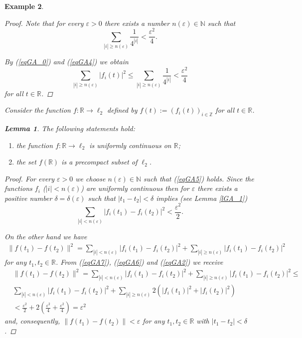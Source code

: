 \documentclass{amsart}%
\newtheorem{lemma}{Lemma}[section]
\newtheorem{example}[lemma]{Example}
\begin{document}
\begin{example}
\begin{proof}
Note that for every $\varepsilon >0$ there exists a number
$n(\varepsilon)\in \mathbb N$ such that
\begin{equation}\label{eqGA4}
\sum\limits_{|i|\ge
n(\varepsilon)}\frac{1}{4^{|i|}}<\frac{\varepsilon^{2}}{4} .
\end{equation}

By (\ref{eqGA_0}) and (\ref{eqGA4}) we obtain
\begin{equation}\label{eqGA5}
\sum\limits_{|i|\ge n(\varepsilon)}|f_{i}(t)|^{2}\le
\sum\limits_{|i|\ge
n(\varepsilon)}\frac{1}{4^{|i|}}<\frac{\varepsilon^{2}}{4}
\end{equation}
for all $t\in \mathbb R$.
\end{proof}

Consider the function $f:\mathbb R\to \ell_{2}$ defined by
$f(t):=(f_{i}(t))_{i\in \mathbb Z}$ for all $t\in \mathbb R$.

\begin{lemma}\label{lGA2} The following statements hold:
\begin{enumerate}
\item the function $f:\mathbb R\to \ell_{2}$ is uniformly
continuous on $\mathbb R$; \item the set $f(\mathbb R)$ is a
precompact subset of $\ell_{2}$.
\end{enumerate}
\end{lemma}
\begin{proof}
For every $\varepsilon >0$ we choose $n(\varepsilon)\in \mathbb N$
such that (\ref{eqGA5}) holds. Since the functions $f_{i}$ ($|i|<
n(\varepsilon)$) are uniformly continuous then for $\varepsilon$
there exists a positive number $\delta =\delta(\varepsilon)$ such
that $|t_1-t_2|<\delta$ implies (see Lemma \ref{lGA_1})
\begin{equation}\label{eqGA6}
\sum\limits_{|i|<
n(\varepsilon)}|f_{i}(t_1)-f_{i}(t_2)|^{2}<\frac{\varepsilon^{2}}{2}
.
\end{equation}

On the other hand we have
\begin{eqnarray}\label{eqGA7}
\|f(t_1)-f(t_2)\|^{2}=\sum\limits_{|i|<
n(\varepsilon)}|f_{i}(t_1)-f_{i}(t_2)|^{2}+ \sum\limits_{|i|\ge
n(\varepsilon)}|f_{i}(t_1)-f_{i}(t_2)|^{2}
\end{eqnarray}
for any $t_1,t_2\in \mathbb R$. From (\ref{eqGA7}), (\ref{eqGA6})
and (\ref{eqGA2}) we receive
\begin{eqnarray}\label{eqGA8}
& \|f(t_1)-f(t_2)\|^{2}=\sum\limits_{|i|<
n(\varepsilon)}|f_{i}(t_1)-f_{i}(t_2)|^{2}+ \sum\limits_{|i|\ge
n(\varepsilon)}|f_{i}(t_1)-f_{i}(t_2)|^{2}\le \nonumber \\
& \sum\limits_{|i|< n(\varepsilon)}|f_{i}(t_1)-f_{i}(t_2)|^{2}+
\sum\limits_{|i|\ge
n(\varepsilon)}2(|f_{i}(t_1)|^{2}+|f_{i}(t_2)|^{2})\nonumber \\
&  < \frac{\varepsilon^{2}}{2}+
2(\frac{\varepsilon^{2}}{4}+\frac{\varepsilon^{2}}{4})=\varepsilon^{2}
\end{eqnarray}
and, consequently, $\|f(t_1)-f(t_2)\|<\varepsilon$ for any
$t_1,t_2\in \mathbb R$ with $|t_1-t_2|<\delta$.


\end{proof}
\end{example}
\end{document}
